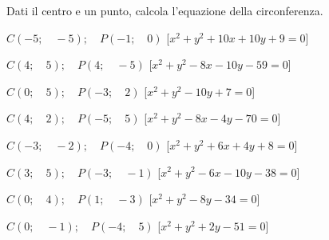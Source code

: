 \begin{esercizio}\label{ese:}
 Dati il centro e un punto, calcola l'equazione della circonferenza.
 \begin{enumeratea}
  \item  \(C \left (-5; \quad -5 \right ); \quad P \left (-1; \quad 0 \right )\)
   \hfill [\(x^2 + y^2 +10x +10y +9 = 0\)]
  \item  \(C \left (4; \quad 5 \right ); \quad P \left (4; \quad -5 \right )\)
   \hfill [\(x^2 + y^2 -8x -10y -59 = 0\)]
  \item  \(C \left (0; \quad 5 \right ); \quad P \left (-3; \quad 2 \right )\)
   \hfill [\(x^2 + y^2 -10y +7 = 0\)]
  \item  \(C \left (4; \quad 2 \right ); \quad P \left (-5; \quad 5 \right )\)
   \hfill [\(x^2 + y^2 -8x -4y -70 = 0\)]
  \item  \(C \left (-3; \quad -2 \right ); \quad P \left (-4; \quad 0 \right )\)
   \hfill [\(x^2 + y^2 +6x +4y +8 = 0\)]
  \item  \(C \left (3; \quad 5 \right ); \quad P \left (-3; \quad -1 \right )\)
   \hfill [\(x^2 + y^2 -6x -10y -38 = 0\)]
  \item  \(C \left (0; \quad 4 \right ); \quad P \left (1; \quad -3 \right )\)
   \hfill [\(x^2 + y^2 -8y -34 = 0\)]
  \item  \(C \left (0; \quad -1 \right ); \quad P \left (-4; \quad 5 \right )\)
   \hfill [\(x^2 + y^2 +2y -51 = 0\)]
 \end{enumeratea}
\end{esercizio}


